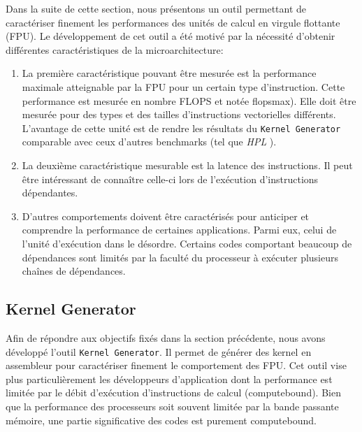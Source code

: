         Dans la suite de cette section, nous présentons  un outil permettant de caractériser finement les performances des unités de calcul en virgule flottante (\gls{FPU}). Le développement de cet outil a été motivé par la nécessité d'obtenir différentes caractéristiques de la microarchitecture:
        \begin{enumerate}
            \item La première caractéristique pouvant être mesurée est la performance maximale atteignable par la FPU pour un certain type d'instruction. Cette performance est mesurée en nombre \gls{FLOPS} et notée \gls{flopsmax}). Elle doit être mesurée pour des types et des tailles d'instructions vectorielles différents. L'avantage de cette unité est de rendre les résultats du  \verb=Kernel Generator= comparable avec ceux d'autres benchmarks (tel que \textit{HPL} \cite{Dongarra2003}).
            
            \item La deuxième caractéristique mesurable est la latence des instructions. Il peut être intéressant de connaître celle-ci lors de l'exécution d'instructions dépendantes.
            
            \item D'autres comportements doivent être caractérisés pour anticiper et comprendre la performance de certaines applications. Parmi eux, celui de l'unité d'exécution dans le désordre. Certains codes comportant beaucoup de dépendances sont limités par la faculté du processeur à exécuter plusieurs chaînes de dépendances. 
        
        \end{enumerate}
 
        
\subsection{Kernel Generator}    

        Afin de répondre aux objectifs fixés dans la section précédente, nous avons développé l'outil \verb=Kernel Generator=. Il permet de générer des \gls{kernel} en assembleur pour caractériser finement le comportement des \gls{FPU}. Cet outil vise plus particulièrement les développeurs d'application dont la performance est limitée par le débit d'exécution d'instructions de calcul (\gls{computebound}). Bien que la performance des processeurs soit souvent limitée par la bande passante mémoire, une partie significative des codes est purement \gls{computebound}. 
        
